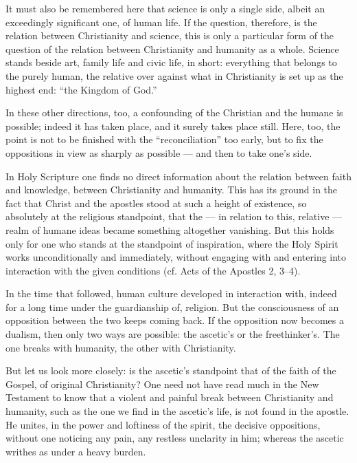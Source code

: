 \documentclass[12pt,a4paper]{book}
\newcommand{\opage}[1]{\marginnote{\footnotesize\textit{[#1]}}}
\begin{document}
It must also be remembered here that science is only a
single side, albeit an exceedingly significant one, of human
life. If the question, therefore, is the relation between Christianity
and science, this is only a particular form of
the question of the relation between Christianity and humanity
as a whole. Science stands beside art, family life
and civic life, in short: everything that belongs to the
purely human, the relative over against what in Christianity
is set up as the highest end: ``the Kingdom of God.''

In these other directions, too, a confounding
of the Christian and the humane is possible; indeed it has taken
place, and it surely takes place still. Here, too, the point is
not to be finished with the ``reconciliation'' too early, but
to fix the oppositions in view as sharply as possible --- and
then to take one's side.

In Holy Scripture one finds no direct information
about the relation between faith and knowledge, between Christianity
and humanity. This has its ground in the fact that Christ
and the apostles stood at such a height of existence, so
absolutely at the religious standpoint, that the --- in relation
to this, relative --- realm of humane ideas became something altogether vanishing.
But this holds only for one who stands at the standpoint of
inspiration, where the Holy Spirit works unconditionally
and immediately, without engaging with and entering into interaction
with the given conditions (cf. Acts of the Apostles
2, 3--4).

In the time that followed, human culture developed
in interaction with, indeed for a long time under the guardianship of,
\opage{43}\setcounter{footnote}{0}%
religion. But the consciousness of an opposition between
the two keeps coming back. If the opposition now becomes a
dualism, then only two ways are possible: the ascetic's or
the freethinker's. The one breaks with humanity, the other
with Christianity.

But let us look more closely: is the ascetic's standpoint
that of the faith of the Gospel, of original Christianity? One need
not have read much in the New Testament to know that
a violent and painful break between Christianity and humanity,
such as the one we find in the ascetic's life, is not found in
the apostle. He unites, in the power and loftiness of the spirit, the decisive
oppositions, without one noticing any pain,
any restless unclarity in him; whereas the ascetic writhes
as under a heavy burden.
\end{document}
